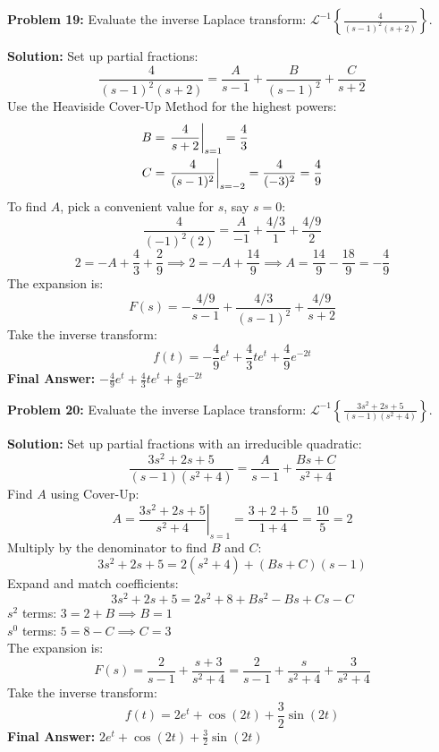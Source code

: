 \documentclass[11pt, letterpaper]{article}
\theoremstyle{definition}
\theoremstyle{remark}
\begin{document}
\vspace{1em}

\textbf{Problem 19:} Evaluate the inverse Laplace transform: $\displaystyle \mathcal{L}^{-1} \left\{ \frac{4}{(s-1)^2(s+2)} \right\}$.

\textbf{Solution:}
Set up partial fractions:
\[
\frac{4}{(s-1)^2(s+2)} = \frac{A}{s-1} + \frac{B}{(s-1)^2} + \frac{C}{s+2}
\]
Use the Heaviside Cover-Up Method for the highest powers:
\begin{align*}
B &= \left. \frac{4}{s+2} \right|_{s=1} = \frac{4}{3} \\ \relax
C &= \left. \frac{4}{(s-1)^2} \right|_{s=-2} = \frac{4}{(-3)^2} = \frac{4}{9}
\end{align*}
To find $A$, pick a convenient value for $s$, say $s=0$:
\[
\frac{4}{(-1)^2(2)} = \frac{A}{-1} + \frac{4/3}{1} + \frac{4/9}{2}
\]
\[
2 = -A + \frac{4}{3} + \frac{2}{9} \implies 2 = -A + \frac{14}{9} \implies A = \frac{14}{9} - \frac{18}{9} = -\frac{4}{9}
\]
The expansion is:
\[
F(s) = -\frac{4/9}{s-1} + \frac{4/3}{(s-1)^2} + \frac{4/9}{s+2}
\]
Take the inverse transform:
\[
f(t) = -\frac{4}{9}e^t + \frac{4}{3}te^t + \frac{4}{9}e^{-2t}
\]
\textbf{Final Answer:} $\displaystyle -\frac{4}{9}e^t + \frac{4}{3}te^t + \frac{4}{9}e^{-2t}$

\vspace{1em}

\textbf{Problem 20:} Evaluate the inverse Laplace transform: $\displaystyle \mathcal{L}^{-1} \left\{ \frac{3s^2 + 2s + 5}{(s-1)(s^2 + 4)} \right\}$.

\textbf{Solution:}
Set up partial fractions with an irreducible quadratic:
\[
\frac{3s^2 + 2s + 5}{(s-1)(s^2 + 4)} = \frac{A}{s-1} + \frac{Bs + C}{s^2 + 4}
\]
Find $A$ using Cover-Up:
\[
A = \left. \frac{3s^2 + 2s + 5}{s^2 + 4} \right|_{s=1} = \frac{3 + 2 + 5}{1 + 4} = \frac{10}{5} = 2
\]
Multiply by the denominator to find $B$ and $C$:
\[
3s^2 + 2s + 5 = 2(s^2 + 4) + (Bs + C)(s-1)
\]
Expand and match coefficients:
\[
3s^2 + 2s + 5 = 2s^2 + 8 + Bs^2 - Bs + Cs - C
\]
$s^2$ terms: $3 = 2 + B \implies B = 1$ \\
$s^0$ terms: $5 = 8 - C \implies C = 3$ \\
The expansion is:
\[
F(s) = \frac{2}{s-1} + \frac{s + 3}{s^2 + 4} = \frac{2}{s-1} + \frac{s}{s^2 + 4} + \frac{3}{s^2 + 4}
\]
Take the inverse transform:
\[
f(t) = 2e^t + \cos(2t) + \frac{3}{2}\sin(2t)
\]
\textbf{Final Answer:} $\displaystyle 2e^t + \cos(2t) + \frac{3}{2}\sin(2t)$

\vspace{1em}
\end{document}
